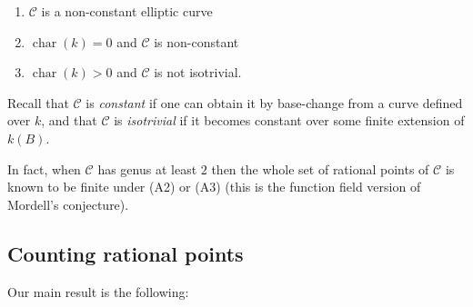 \documentclass[11pt]{article}
\theoremstyle{plain}
\theoremstyle{definition}
\DeclareMathOperator{\car}{char}
\begin{document}
\begin{enumerate}
\item[(A1)] $\mathcal{C}$ is a non-constant elliptic curve
\item[(A2)] $\car(k)=0$ and $\mathcal{C}$ is non-constant
\item[(A3)] $\car(k)>0$ and $\mathcal{C}$ is not isotrivial.
\end{enumerate}

Recall that $\mathcal{C}$ is \emph{constant} if one can obtain it by base-change from a curve defined over $k$, and that $\mathcal{C}$ is \emph{isotrivial} if it becomes constant over some finite extension of $k(B)$.


In fact, when $\mathcal{C}$ has genus at least $2$ then the whole set of rational points of $\mathcal{C}$ is known to be finite under (A2) or (A3) (this is the function field version of Mordell's conjecture).

\subsection*{Counting rational points}

Our main result is the following:
\end{document}
